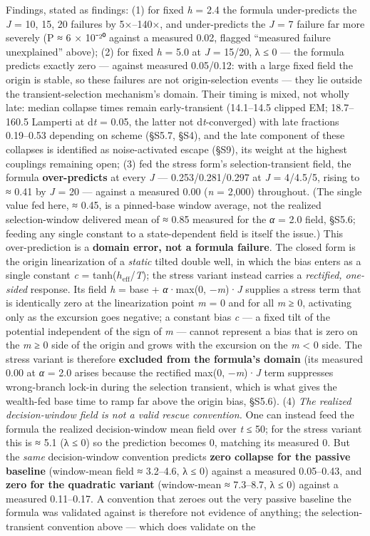 \documentclass[11pt,letterpaper]{article}
\begin{document}
Findings, stated as findings: (1) for fixed \emph{h} = 2.4 the formula under-predicts the \emph{J} = 10, 15, 20 failures by 5×--140×, and under-predicts the \emph{J} = 7 failure far more severely (P ≈ 6 × 10⁻²⁰ against a measured 0.02, flagged ``measured failure unexplained'' above); (2) for fixed \emph{h} = 5.0 at \emph{J} = 15/20, λ ≤ 0 --- the formula predicts exactly zero --- against measured 0.05/0.12: with a large fixed field the origin is stable, so these failures are not origin-selection events --- they lie outside the transient-selection mechanism's domain. Their timing is mixed, not wholly late: median collapse times remain early-transient (14.1--14.5 clipped EM; 18.7--160.5 Lamperti at d\emph{t} = 0.05, the latter not d\emph{t}-converged) with late fractions 0.19--0.53 depending on scheme (§S5.7, §S4), and the late component of these collapses is identified as noise-activated escape (§S9), its weight at the highest couplings remaining open; (3) fed the stress form's selection-transient field, the formula \textbf{over-predicts} at every \emph{J} --- 0.253/0.281/0.297 at \emph{J} = 4/4.5/5, rising to ≈ 0.41 by \emph{J} = 20 --- against a measured 0.00 (\emph{n} = 2,000) throughout. (The single value fed here, ≈ 0.45, is a pinned-base window average, not the realized selection-window delivered mean of ≈ 0.85 measured for the \emph{α} = 2.0 field, §S5.6; feeding any single constant to a state-dependent field is itself the issue.) This over-prediction is a \textbf{domain error, not a formula failure}. The closed form is the origin linearization of a \emph{static} tilted double well, in which the bias enters as a single constant \emph{c} = tanh(\(h_{\mathrm{eff}}\)/\emph{T}); the stress variant instead carries a \emph{rectified, one-sided} response. Its field \emph{h} = base + \emph{α}·max(0, −\emph{m})·\emph{J} supplies a stress term that is identically zero at the linearization point \emph{m} = 0 and for all \emph{m} ≥ 0, activating only as the excursion goes negative; a constant bias \emph{c} --- a fixed tilt of the potential independent of the sign of \emph{m} --- cannot represent a bias that is zero on the \emph{m} ≥ 0 side of the origin and grows with the excursion on the \emph{m} \textless{} 0 side. The stress variant is therefore \textbf{excluded from the formula's domain} (its measured 0.00 at \emph{α} = 2.0 arises because the rectified max(0, −\emph{m})·\emph{J} term suppresses wrong-branch lock-in during the selection transient, which is what gives the wealth-fed base time to ramp far above the origin bias, §S5.6). (4) \emph{The realized decision-window field is not a valid rescue convention.} One can instead feed the formula the realized decision-window mean field over \emph{t} ≤ 50; for the stress variant this is ≈ 5.1 (λ ≤ 0) so the prediction becomes 0, matching its measured 0. But the \emph{same} decision-window convention predicts \textbf{zero collapse for the passive baseline} (window-mean field ≈ 3.2--4.6, λ ≤ 0) against a measured 0.05--0.43, and \textbf{zero for the quadratic variant} (window-mean ≈ 7.3--8.7, λ ≤ 0) against a measured 0.11--0.17. A convention that zeroes out the very passive baseline the formula was validated against is therefore not evidence of anything; the selection-transient convention above --- which does validate on the 
\end{document}
